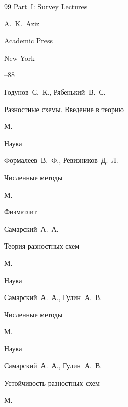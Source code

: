 \begin{thebibliography}{99}
\bookinfo Part~I: Survey Lectures

\ed A.~K.~Aziz

\publ Academic Press

\publaddr New York


--88







\by Годунов~С.~К., Рябенький~В.~С.

\book Разностные схемы. Введение в теорию

\publaddr  М.

\publ Наука






\by Формалеев~В.~Ф., Ревизников~Д.~Л.

\book Численные методы

\publaddr М.

\publ Физматлит






\by Самарский~А.~А.

\book Теория разностных схем

\publaddr  М.

\publ Наука






\by Самарский~А.~А., Гулин~А.~В.

\book Численные методы

\publaddr  М.

\publ Наука






\by Самарский~А.~А., Гулин~А.~В.

\book Устойчивость разностных схем

\publaddr  М.


\end{thebibliography}
